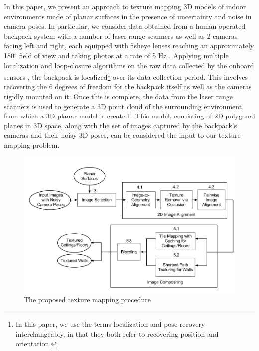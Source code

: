 \documentclass[]{spie}  %
\begin{document}
In this paper, we present an approach to texture mapping 3D models of
indoor environments made of planar surfaces in the presence of
uncertainty and noise in camera poses. In particular, we consider data
obtained from a human-operated backpack system with a number of laser
range scanners as well as 2 cameras facing left and right, each
equipped with fisheye lenses reaching an approximately 180$^{\circ}$
field of view and taking photos at a rate of 5 Hz
\cite{liu2010indoor}. Applying multiple localization and loop-closure
algorithms on the raw data collected by the onboard sensors
\cite{chen2010indoor, kua2012loopclosure, liu2010indoor}, the backpack
is localized\footnote{In this paper, we use the terms localization and
  pose recovery interchangeably, in that they both refer to recovering
  position and orientation.}  over its data collection period. This
involves recovering the 6 degrees of freedom for the backpack itself
as well as the cameras rigidly mounted on it. Once this is complete,
the data from the laser range scanners is used to generate a 3D point
cloud of the surrounding environment, from which a 3D planar model is
created \cite{sanchez2012point}. This model, consisting of 2D
polygonal planes in 3D space, along with the set of images captured by
the backpack's cameras and their noisy 3D poses, can be considered the
input to our texture mapping problem.

\begin{figure}
  \centering
  \includegraphics[width=6in]{flowchart.jpg}
  \caption{The proposed texture mapping procedure\\}
  \label{fig:flowchart}
\end{figure}
\end{document}
